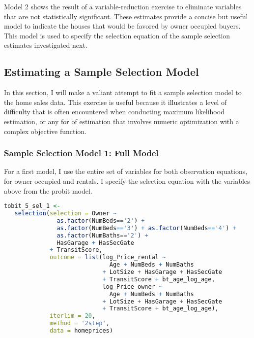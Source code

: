 % 
Model 2 shows the result of a variable-reduction exercise
to eliminate variables that are not statistically significant.
These estimates provide a concise but useful model to
indicate the houses that would be favored by owner occupied buyers.
This model is used to specify the selection equation
of the sample selection estimates investigated next. 
 
\subsection{Estimating a Sample Selection Model}

In this section, I will make a valiant attempt to fit 
a sample selection model to the home sales data. 
This exercise is useful because it illustrates a level of difficulty
that is often encountered when conducting maximum likelihood estimation, 
or any for of estimation that involves numeric optimization
with a complex objective function. 

\subsubsection{Sample Selection Model 1: Full Model}

For a first model, I use the entire set of variables
for both observation equations, for owner occupied and rentals.
I specify the selection equation with the variables above
from the probit model.


\begin{lstlisting}[language=R]
tobit_5_sel_1 <-
   selection(selection = Owner ~
               as.factor(NumBeds=='2') + 
               as.factor(NumBeds=='3') + as.factor(NumBeds=='4') +
               as.factor(NumBaths=='2') +
               HasGarage + HasSecGate
             + TransitScore,
             outcome = list(log_Price_rental ~
                              Age + NumBeds + NumBaths
                            + LotSize + HasGarage + HasSecGate
                            + TransitScore + bt_age_log_age,
                            log_Price_owner ~
                              Age + NumBeds + NumBaths
                            + LotSize + HasGarage + HasSecGate
                            + TransitScore + bt_age_log_age),
             iterlim = 20,
             method = '2step',
             data = homeprices)
\end{lstlisting}


